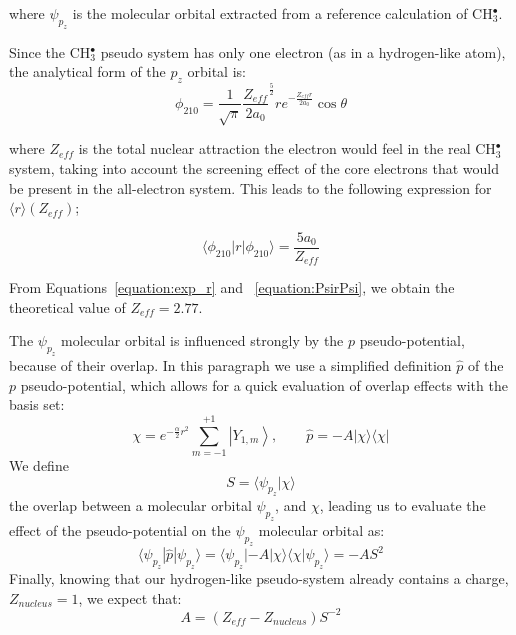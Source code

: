\documentclass[12pt]{article}
\begin{document}
where \(\psi_{p_{z}}\) is the molecular orbital extracted from a reference calculation of CH\(^{\bullet}_{3}\). 

Since the CH\(^{\bullet}_{3}\) pseudo system has only one electron (as in a hydrogen-like atom), 
the analytical form of the \(p_{z}\) orbital is:~\cite{me_structure_theory} 
\begin{equation}
\label{equation:analyticalpz}
\phi_{210} = \frac{1}{\sqrt{\pi}} \frac{Z_{eff}}{2a_{0}} ^{\frac{5}{2}} re^{-\frac{Z_{eff}r}{2a_{0}}} \cos \theta
\end{equation}

where \(Z_{eff}\) is the total nuclear attraction the electron 
would feel in the real CH\(^{\bullet}_{3}\) system, taking into account the screening effect of the core electrons that would be 
present in the all-electron system.
This leads to the following expression for \( \langle r \rangle (Z_{eff}) \); 

\begin{equation}
\label{equation:PsirPsi}
\langle \phi_{210} | r | \phi_{210} \rangle = \frac{5a_{0}}{Z_{eff}}
\end{equation}

From Equations~\ref{equation:exp_r} and ~\ref{equation:PsirPsi}, we obtain the theoretical value of \(Z_{eff} = 2.77\).

The \(\psi_{p_{z}}\) molecular orbital is influenced strongly by the $p$ pseudo-potential,
because of their overlap. In this paragraph we use a simplified definition $\widehat{p}$ of the $p$ pseudo-potential, which allows for a quick evaluation of overlap effects with the basis set: 
\begin{equation}
\chi = e^{-\frac{\alpha}{2} r^{2}}\sum_{m=-1}^{+1}\left|Y_{1,m}\right>,\qquad \widehat{p} = -A | \chi \rangle \langle \chi |
\end{equation}
We define
\begin{equation}
S = \langle \psi_{p_{z}} | \chi \rangle
\end{equation}
the overlap between a molecular orbital \(\psi_{p_{z}}\), and \(\chi\),
leading us to evaluate the effect of the pseudo-potential on the \(\psi_{p_{z}}\) molecular orbital as:
\begin{equation}
\langle \psi_{p_{z}} | \widehat{p} | \psi_{p_{z}} \rangle = \langle \psi_{p_{z}} | -A | \chi \rangle \langle \chi | \psi_{p_{z}} \rangle = -A S^{2}
\end{equation}
Finally, knowing that our hydrogen-like pseudo-system already contains a charge, \(Z_{nucleus}=1\), 
we expect that:
\begin{equation}
A = (Z_{eff} - Z_{nucleus})S^{-2}
\label{eqpseudo}
\end{equation}
\end{document}
